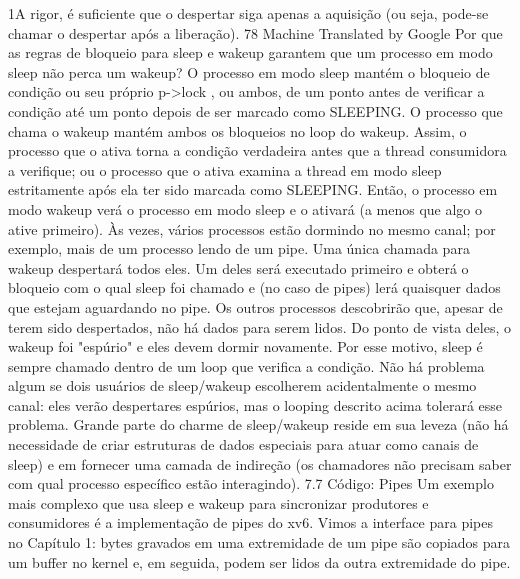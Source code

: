  1A  rigor,  é  suficiente  que  o  despertar  siga  apenas  a  aquisição  (ou  seja,  pode-se  chamar  o  despertar  após  a  liberação).
 78
Machine Translated by Google
 Por  que  as  regras  de  bloqueio  para  sleep  e  wakeup  garantem  que  um  processo  em  modo  sleep  não  perca  
um  wakeup?  O  processo  em  modo  sleep  mantém  o  bloqueio  de  condição  ou  seu  próprio  p->lock ,  ou  ambos,  de  
um  ponto  antes  de  verificar  a  condição  até  um  ponto  depois  de  ser  marcado  como  SLEEPING.  O  processo  que  
chama  o  wakeup  mantém  ambos  os  bloqueios  no  loop  do  wakeup.  Assim,  o  processo  que  o  ativa  torna  a  
condição  verdadeira  antes  que  a  thread  consumidora  a  verifique;  ou  o  processo  que  o  ativa  examina  a  thread  
em  modo  sleep  estritamente  após  ela  ter  sido  marcada  como  SLEEPING.  Então,  o  processo  em  modo  wakeup  
verá  o  processo  em  modo  sleep  e  o  ativará  (a  menos  que  algo  o  ative  primeiro).
 Às  vezes,  vários  processos  estão  dormindo  no  mesmo  canal;  por  exemplo,  mais  de  um  processo  lendo  de  
um  pipe.  Uma  única  chamada  para  wakeup  despertará  todos  eles.  Um  deles  será  executado  primeiro  e  obterá  o  
bloqueio  com  o  qual  sleep  foi  chamado  e  (no  caso  de  pipes)  lerá  quaisquer  dados  que  estejam  aguardando  no  
pipe.  Os  outros  processos  descobrirão  que,  apesar  de  terem  sido  despertados,  não  há  dados  para  serem  lidos.  
Do  ponto  de  vista  deles,  o  wakeup  foi  "espúrio"  e  eles  devem  dormir  novamente.  Por  esse  motivo,  sleep  é  sempre  
chamado  dentro  de  um  loop  que  verifica  a  condição.
 Não  há  problema  algum  se  dois  usuários  de  sleep/wakeup  escolherem  acidentalmente  o  mesmo  canal:  eles  
verão  despertares  espúrios,  mas  o  looping  descrito  acima  tolerará  esse  problema.  Grande  parte  do  charme  de  
sleep/wakeup  reside  em  sua  leveza  (não  há  necessidade  de  criar  estruturas  de  dados  especiais  para  atuar  como  
canais  de  sleep)  e  em  fornecer  uma  camada  de  indireção  (os  chamadores  não  precisam  saber  com  qual  processo  
específico  estão  interagindo).
 7.7  Código:  Pipes
 Um  exemplo  mais  complexo  que  usa  sleep  e  wakeup  para  sincronizar  produtores  e  consumidores  é  a  
implementação  de  pipes  do  xv6.  Vimos  a  interface  para  pipes  no  Capítulo  1:  bytes  gravados  em  uma  extremidade  
de  um  pipe  são  copiados  para  um  buffer  no  kernel  e,  em  seguida,  podem  ser  lidos  da  outra  extremidade  do  pipe.
